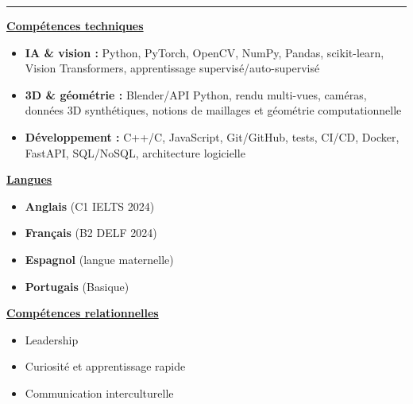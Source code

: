 \documentclass[letterpaper,10pt]{article}
\begin{document}
  

\vspace{9pt}
\noindent\rule{\textwidth}{0.4pt}
\vspace{2pt}

\noindent
\begin{minipage}[t]{0.39\textwidth}
  \raggedright
  \textbf{\underline{Compétences techniques}}\\[-2pt]
  {\scriptsize
    \begin{itemize}[leftmargin=*,itemsep=1pt,parsep=0pt,topsep=0pt,partopsep=0pt]
      \item \textbf{IA \& vision :} Python, PyTorch, OpenCV, NumPy, Pandas, scikit-learn, Vision Transformers, apprentissage supervisé/auto-supervisé
      \item \textbf{3D \& géométrie :} Blender/API Python, rendu multi-vues, caméras, données 3D synthétiques, notions de maillages et géométrie computationnelle
      \item \textbf{Développement :} C++/C, JavaScript, Git/GitHub, tests, CI/CD, Docker, FastAPI, SQL/NoSQL, architecture logicielle
    \end{itemize}
  }
\end{minipage}\hfill
\begin{minipage}[t]{0.28\textwidth}
  \raggedright
  \textbf{\underline{Langues}}\\[-2pt]
  {\scriptsize
    \begin{itemize}[leftmargin=*,itemsep=0pt,parsep=0pt,topsep=0pt,partopsep=0pt]
      \item \textbf{Anglais} (C1 \textendash{} IELTS 2024)
      \item \textbf{Français} (B2 \textendash{} DELF 2024)
      \item \textbf{Espagnol} (langue maternelle)
      \item \textbf{Portugais} (Basique)
    \end{itemize}
  }

  \vspace{0.12cm}
  \textbf{\underline{Compétences relationnelles}}\\[-2pt]
  {\scriptsize
    \begin{itemize}[leftmargin=*,itemsep=1pt,parsep=0pt,topsep=0pt,partopsep=0pt]
      \item Leadership
      \item Curiosité et apprentissage rapide
      \item Communication interculturelle
    \end{itemize}
  }
\end{minipage}\hfill
\end{document}
